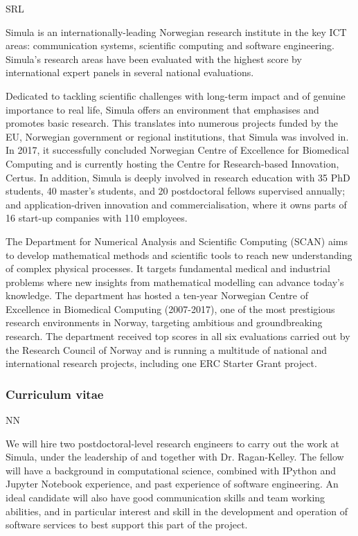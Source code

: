 \begin{sitedescription}{SRL}

Simula is an internationally-leading Norwegian research institute in the key
ICT areas: communication systems, scientific computing and software
engineering. Simula's research areas have been evaluated with the highest
score by international expert panels in several national evaluations.

Dedicated to tackling scientific challenges with long-term impact and of
genuine importance to real life, Simula offers an environment that emphasises
and promotes basic research. This translates into numerous projects funded by
the EU, Norwegian government or regional institutions, that Simula was
involved in. In 2017, it successfully concluded Norwegian Centre of Excellence
for Biomedical Computing and is currently hosting the Centre for
Research-based Innovation, Certus. In addition, Simula is deeply involved in
research education with 35 PhD students, 40 master's students, and 20
postdoctoral fellows supervised annually; and application-driven innovation
and commercialisation, where it owns parts of 16 start-up companies with 110
employees.

The Department for Numerical Analysis and Scientific Computing (SCAN) aims to
develop mathematical methods and scientific tools to reach new understanding
of complex physical processes. It targets fundamental medical and industrial
problems where new insights from mathematical modelling can advance today's
knowledge. The department has hosted a ten-year Norwegian Centre of Excellence
in Biomedical Computing (2007-2017), one of the most prestigious research
environments in Norway, targeting ambitious and groundbreaking research. The
department received top scores in all six evaluations carried out by the
Research Council of Norway and is running a multitude of national and
international research projects, including one ERC Starter Grant project.

\subsubsection*{Curriculum vitae}





\begin{participant}[PM=72, type=R]{NN}

We will hire two postdoctoral-level research engineers to carry out the work
at Simula, under the leadership of and together with Dr. Ragan-Kelley.  The
fellow will have a background in computational science, combined with IPython
and Jupyter Notebook experience, and past experience of software engineering.
An ideal candidate will also have good communication skills and team working
abilities, and in particular interest and skill in the development and
operation of software services to best support this part of the project.


\end{participant}
\end{sitedescription}
